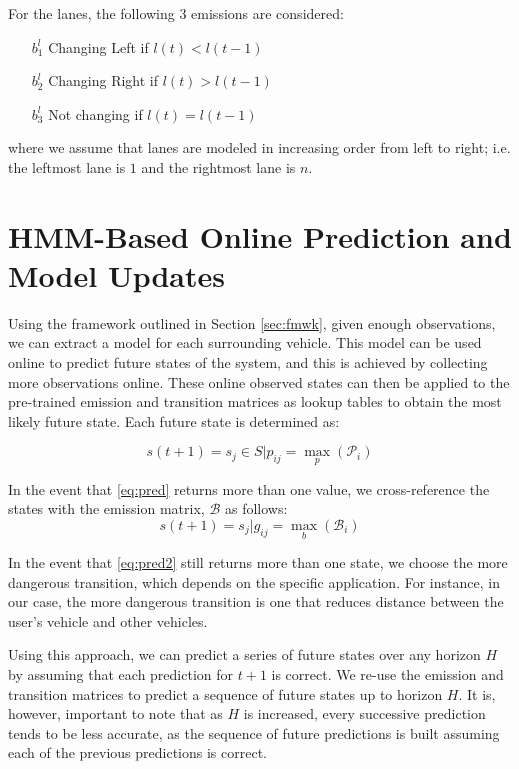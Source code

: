 \documentclass[letterpaper, 10 pt, conference]{ieeeconf}  %
\begin{document}
For the lanes, the following 3 emissions are considered:

\begin{enumerate}
    \item[$b_1^l$] Changing Left if $l(t) < l(t-1)$
    \item[$b_2^l$] Changing Right if $l(t) > l(t-1)$
    \item[$b_3^l$] Not changing if  $l(t) = l(t-1)$
\end{enumerate}
where we assume that lanes are modeled in increasing order from left to right; i.e. the leftmost lane is $1$ and the rightmost lane is $n$.


\section{HMM-Based Online Prediction and Model Updates} \label{sec:ahmmpredupdate}
  Using the framework outlined in Section \ref{sec:fmwk}, given enough observations, we can extract a model for each surrounding vehicle. This model can be used online to predict future states of the system, and this is achieved by collecting more observations online. These online observed states can then be applied to the pre-trained emission and transition matrices as lookup tables to obtain the most likely future state. Each future state is determined as:
 
\begin{equation} \label{eq:pred}
   s(t+1) = s_j \in S \vert p_{ij}=\max_p(\mathcal{P}_i)
\end{equation}

In the event that \eqref{eq:pred} returns more than one value, we cross-reference the states with the emission matrix, $\mathcal{B}$ as follows: 
\begin{equation} \label{eq:pred2}
    s(t+1)=s_j\vert g_{ij} = \max_b(\mathcal{B}_i)    
\end{equation}


In the event that \eqref{eq:pred2} still returns more than one state, we choose the more dangerous transition, which depends on the specific application. For instance, in our case, the more dangerous transition is one that reduces distance between the user's vehicle and other vehicles.

Using this approach, we can predict a series of future states over any horizon $H$ by assuming that each prediction for $t+1$ is correct. We re-use the emission and transition matrices to predict a sequence of future states up to horizon $H$.
It is, however, important to note that as $H$ is increased, every successive prediction tends to be less accurate, as the sequence of future predictions is built assuming each of the previous predictions is correct.
\end{document}
